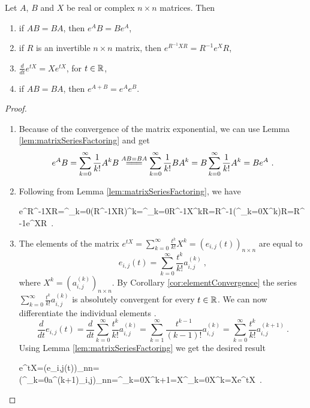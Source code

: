 \begin{lemma}
\label{lem:expprop}
	Let $A$, $B$ and $X$ be real or complex $n\times n$ matrices. Then 
	\begin{enumerate}
		\item if $AB = BA$, then $e^{A}B = Be^{A}$,
		\item if $R$ is an invertible $n\times n$ matrix, then $e^{R^{-1}XR}=R^{-1}e^XR$,
		\item $\frac{d}{dt}e^{tX}=Xe^{tX}$, for $t \in \mathbb{R}$,
		\item if $AB = BA$, then $e^{A+B} = e^{A}e^B$.
	\end{enumerate}
\end{lemma}

\begin{proof}
	\begin{enumerate}
		\item
		Because of the convergence of the matrix exponential, we can use Lemma \ref{lem:matrixSeriesFactoring} and get
		$$e^{A}B=\sum^\infty_{k=0}\frac{1}{k!}A^{k}B\stackrel{AB=BA}{=\joinrel=\joinrel=}\sum^\infty_{k=0}\frac{1}{k!}BA^{k}=B\sum^\infty_{k=0}\frac{1}{k!}A^{k}=Be^{A}\ .$$
		
		\item Following from Lemma \ref{lem:matrixSeriesFactoring}, we have 
		\begin{longeq}
			e^{R^{-1}XR}=\sum^\infty_{k=0}(R^{-1}XR)^{k}=\sum^\infty_{k=0}R^{-1}X^{k}R=R^{-1}\left(\sum^\infty_{k=0}X^{k}\right)R=R^{-1}e^{X}R\ . 
		\end{longeq}

		\item The elements of the matrix $e^{tX}=\sum^\infty_{k=0}\frac{t^k}{k!}X^{k}=(e_{i,j}(t))_{n\times n}$ are equal to
		$$e_{i,j}(t)=\sum^\infty_{k=0}\frac{t^k}{k!}a^{(k)}_{i,j}\ ,$$
		where $X^k=(a^{(k)}_{i,j})_{n\times n}$. By Corollary \ref{cor:elementConvergence} the series $\sum^\infty_{k=0}\frac{t^k}{k!}a^{(k)}_{i,j}$ is absolutely convergent for every $t\in\mathbb{R}$. We can now differentiate the individual elements \citep[see][Věta 8.2.2]{Pick}.
		$$\frac{d}{dt}e_{i,j}(t)=\frac{d}{dt}\sum^\infty_{k=0}\frac{t^k}{k!}a^{(k)}_{i,j}=\sum^\infty_{k=1}\frac{t^{k-1}}{(k-1)!}a^{(k)}_{i,j}=\sum^\infty_{k=0}\frac{t^{k}}{k!}a^{(k+1)}_{i,j}\ .$$ 
		Using Lemma \ref{lem:matrixSeriesFactoring} we get the desired result
		\begin{longeq}
			e^{tX}=\left(e_{i,j}(t)\right)_{n\times n}=\left(\sum^\infty_{k=0}a^{(k+1)}_{i,j}\right)_{n\times n}=\sum^\infty_{k=0}X^{k+1}=X\sum^\infty_{k=0}X^{k}=Xe^{tX}\ .
		\end{longeq}


\end{enumerate}
\end{proof}
